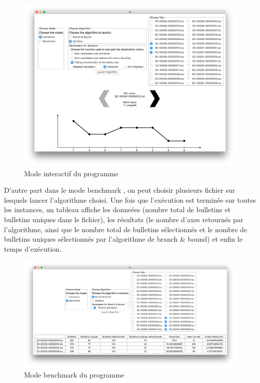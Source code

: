 \documentclass[11pt, a4paper]{article}
\begin{document}
\begin{center}
\begin{figure}[H]
\includegraphics[scale=0.42]{Images/interactive-seriation.png}
\caption{Mode \og interactif \fg{} du programme}
\end{figure}
\end{center}

D'autre part dans le mode \og benchmark \fg, on peut choisir plusieurs fichier sur lesquels lancer l'algorithme choisi. Une fois que l'exécution est terminée sur toutes les instances, un tableau affiche les donneées (nombre total de bulletins et bulletins uniques dans le fichier), les résultats (le nombre d'axes retournés par l'algorithme, ainsi que le nombre total de bulletins sélectionnés et le nombre de bulletins uniques sélectionnés par l'algorithme de branch \& bound) et enfin le temps d'exécution.

\begin{center}
\begin{figure}[H]
\includegraphics[scale=0.37]{Images/benchmark-bnb.png}
\caption{Mode \og benchmark \fg{} du programme}
\end{figure}
\end{center}
\end{document}
